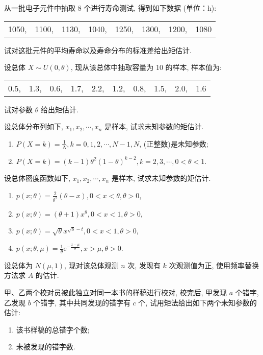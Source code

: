 \begin{xiti}
\item 从一批电子元件中抽取 8 个进行寿命测试, 得到如下数据 (单位：h):
\begin{center}
\begin{tabular}{cccccccc}
	1050,&1100,&1130,&1040,&1250,&1300,&1200,&1080
\end{tabular}
\end{center}
试对这批元件的平均寿命以及寿命分布的标准差给出矩估计.
\item 设总体 $X\sim U(0,\theta)$, 现从该总体中抽取容量为 10 的样本, 样本值为:
\begin{center}
\begin{tabular}{cccccccccc}
0.5,&1.3,&0.6,&1.7,&2.2,&1.2,&0.8,&1.5,&2.0,&1.6
\end{tabular}	
\end{center}
试对参数 $\theta$ 给出矩估计.
\item 设总体分布列如下, $x_1,x_2,\cdots,x_n$ 是样本, 试求未知参数的矩估计.
\begin{enumerate}
\item $P(X=k)=\frac{1}{N}, k=0,1,2, \cdots, N-1, N$, (正整数)是未知参数;
\item  $P(X=k)=(k-1) \theta^{2}(1-\theta)^{k-2}, k=2,3, \cdots, 0<\theta<1$.
\end{enumerate}

\item 设总体密度函数如下, $x_1,x_2,\cdots,x_n$ 是样本, 试求未知参数的矩估计. 
\begin{enumerate}
  \item $p(x ; \theta)=\frac{2}{\theta^{2}}(\theta-x), 0<x<\theta, \theta>0$, 
  \item $p(x ; \theta)=(\theta+1) x^{8}, 0<x<1, \theta>0$, 
  \item $p(x ; \theta)=\sqrt{\theta} x^{\sqrt8-t}, 0<x<1, \theta>0$, 
  \item $p(x ; \theta, \mu)=\frac{1}{\theta} \mathrm{e}^{-\frac{x-\mu}{\theta}}, x>\mu, \theta>0$.
\end{enumerate}

\item 设总体为 $N(\mu,1)$, 现对该总体观测 $n$ 次, 发现有 $k$ 次观测值为正, 使用频率替换方法求 $A$ 的估计.
\item 甲、乙两个校对员被此独立对同一本书的样稿进行校对, 校完后, 甲发现 $a$ 个错字, 乙发现 $b$ 个错字, 其中共同发现的错字有 $c$ 个, 试用矩法给出如下两个未知参数的估计:
\begin{enumerate}
  \item 该书样稿的总错字个数;
  \item 未被发现的错字数.
\end{enumerate}


\end{xiti}
